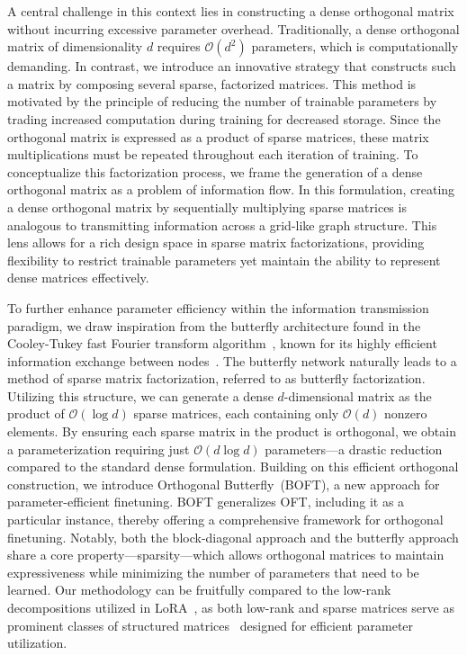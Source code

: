 A central challenge in this context lies in constructing a dense orthogonal matrix without incurring excessive parameter overhead. Traditionally, a dense orthogonal matrix of dimensionality $d$ requires $\mathcal{O}(d^2)$ parameters, which is computationally demanding. In contrast, we introduce an innovative strategy that constructs such a matrix by composing several sparse, factorized matrices. This method is motivated by the principle of reducing the number of trainable parameters by trading increased computation during training for decreased storage. Since the orthogonal matrix is expressed as a product of sparse matrices, these matrix multiplications must be repeated throughout each iteration of training. To conceptualize this factorization process, we frame the generation of a dense orthogonal matrix as a problem of information flow. In this formulation, creating a dense orthogonal matrix by sequentially multiplying sparse matrices is analogous to transmitting information across a grid-like graph structure. This lens allows for a rich design space in sparse matrix factorizations, providing flexibility to restrict trainable parameters yet maintain the ability to represent dense matrices effectively.

To further enhance parameter efficiency within the information transmission paradigm, we draw inspiration from the butterfly architecture found in the Cooley-Tukey fast Fourier transform algorithm~\cite{cooley1965algorithm}, known for its highly efficient information exchange between nodes~\cite{klasing1994broadcasting}. The butterfly network naturally leads to a method of sparse matrix factorization, referred to as butterfly factorization. Utilizing this structure, we can generate a dense $d$-dimensional matrix as the product of $\mathcal{O}(\log d)$ sparse matrices, each containing only $\mathcal{O}(d)$ nonzero elements. By ensuring each sparse matrix in the product is orthogonal, we obtain a parameterization requiring just $\mathcal{O}(d\log d)$ parameters—a drastic reduction compared to the standard dense formulation. Building on this efficient orthogonal construction, we introduce Orthogonal Butterfly~(BOFT), a new approach for parameter-efficient finetuning. BOFT generalizes OFT, including it as a particular instance, thereby offering a comprehensive framework for orthogonal finetuning. Notably, both the block-diagonal approach and the butterfly approach share a core property—sparsity—which allows orthogonal matrices to maintain expressiveness while minimizing the number of parameters that need to be learned. Our methodology can be fruitfully compared to the low-rank decompositions utilized in LoRA~\cite{hulora2022}, as both low-rank and sparse matrices serve as prominent classes of structured matrices~\cite{candes2011robust} designed for efficient parameter utilization.

